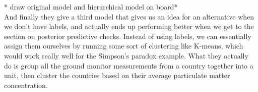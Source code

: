 \documentclass[]{article}
\begin{document}
* draw original model and hierarchical model on board*
\\

And finally they give a third model that gives us an idea for an alternative when we don't have labels, and actually ends up performing better when we get to the section on posterior predictive checks. Instead of using labels, we can essentially assign them ourselves by running some sort of clustering like K-means, which would work really well for the Simpson's paradox example. What they actually do is group all the ground monitor measurements from a country together into a unit, then cluster the countries based on their average particulate matter concentration. 
\end{document}
